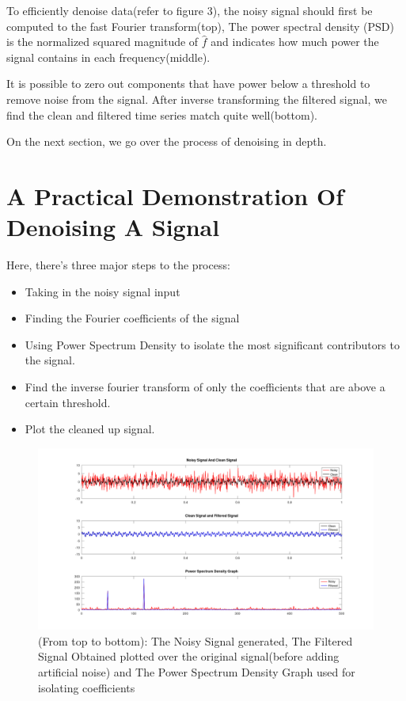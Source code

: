 \documentclass[11pt]{amsart}
\theoremstyle{definition}
\theoremstyle{remark}
\numberwithin{equation}{section}
\begin{document}
 To efficiently denoise data(refer to figure 3), the noisy signal should first be computed to the fast Fourier transform(top), The power spectral density (PSD) is the normalized squared magnitude of $\hat{f}$ and indicates how much power the signal contains in each frequency(middle). 

It is possible to zero out components that have power below a threshold to remove noise from the signal. After inverse transforming the filtered signal, we find the clean and filtered time series match quite well(bottom).

On the next section, we go over the process of denoising in depth.
\section{A Practical Demonstration Of Denoising A Signal}

Here, there's three major steps to the process:
\begin{itemize}
	\item Taking in the noisy signal input
	\item Finding the Fourier coefficients of the signal
	\item Using Power Spectrum Density to isolate the most significant contributors to the signal.
	\item Find the inverse fourier transform of only the coefficients that are above a certain threshold.
	\item Plot the cleaned up signal.
\end{itemize}

\begin{figure} [h]
     \centering
     \includegraphics[width=0.7\linewidth]{../plots/denoise.png}
     \caption{(From top to bottom): The Noisy Signal generated, The Filtered Signal Obtained plotted over the original signal(before adding artificial noise) and The Power Spectrum Density Graph used for isolating coefficients} \label{fig:5}
\end{figure}
\end{document}
